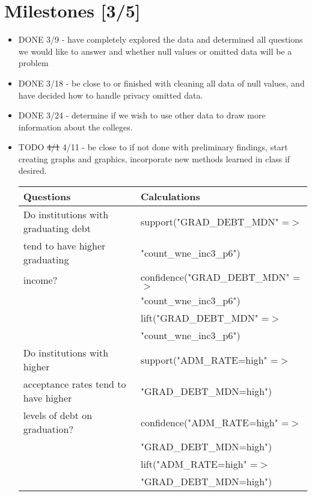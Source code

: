 \documentclass[11pt]{article}
\begin{document}
\section*{Milestones [3/5]}
\label{sec-5}
\begin{itemize}
\item DONE 3/9 - have completely explored the data and determined all questions we would like to answer and whether null values or omitted data will be a problem
\item DONE 3/18 - be close to or finished with cleaning all data of null values, and have decided how to handle privacy omitted data.
\item DONE 3/24 - determine if we wish to use other data to draw more information about the colleges.
\item TODO \sout{4/1} 4/11 - be close to if not done with preliminary findings, start creating graphs and graphics, incorporate new methods learned in class if desired.
\begin{center}
\begin{tabular}{|l|l|}
\hline
Questions & Calculations \\
\hline
Do institutions with graduating debt & support("GRAD\_DEBT\_MDN" =$>$ \\
tend to have higher graduating & "count\_wne\_inc3\_p6") \\
income? & confidence("GRAD\_DEBT\_MDN" =$>$ \\
 & "count\_wne\_inc3\_p6") \\
 & lift("GRAD\_DEBT\_MDN" =$>$ \\
 & "count\_wne\_inc3\_p6") \\
\hline
Do institutions with higher & support("ADM\_RATE=high" =$>$ \\
acceptance rates tend to have higher & "GRAD\_DEBT\_MDN=high") \\
levels of debt on graduation? & confidence("ADM\_RATE=high" =$>$ \\
 & "GRAD\_DEBT\_MDN=high") \\
 & lift("ADM\_RATE=high" =$>$ \\
 & "GRAD\_DEBT\_MDN=high") \\
\hline
\end{tabular}
\end{center}


\end{itemize}
\end{document}
